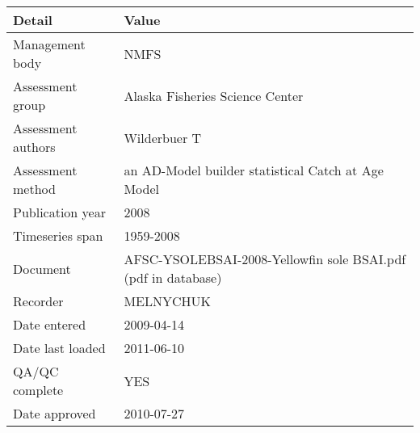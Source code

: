 \begin{table}[htb]
\centering
\begin{tabular}{lp{7cm}}
\toprule
Detail & Value \\
\midrule
Management body    & NMFS                                                          \\
Assessment group   & Alaska Fisheries Science Center                               \\
Assessment authors & Wilderbuer T                                                  \\
Assessment method  & an AD-Model builder statistical Catch at Age Model            \\
Publication year   & 2008                                                          \\
Timeseries span    & 1959-2008                                                     \\
Document           & AFSC-YSOLEBSAI-2008-Yellowfin sole BSAI.pdf (pdf in database) \\
Recorder           & MELNYCHUK                                                     \\
Date entered       & 2009-04-14                                                    \\
Date last loaded   & 2011-06-10                                                    \\
QA/QC complete     & YES                                                           \\
Date approved      & 2010-07-27                                                    \\
\bottomrule
\end{tabular}
\label{tab:assessdet}
\end{table}
